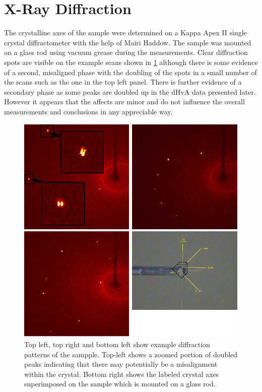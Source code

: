 
\section{X-Ray Diffraction}
    \label{Sec:3:XrayDiffraction}

The crystalline axes of the sample were determined on a Kappa Apex II single crystal diffractometer with the help of Mairi Haddow. The sample was mounted on a glass rod using vacuum grease during the measurements. Clear diffraction spots are visible on the example scans shown in \fig\ref{Fig:3:XRayDiffraction} although there is some evidence of a second, misaligned phase with the doubling of the spots in a small number of the scans such as the one in the top left panel. There is further evidence of a secondary phase as some peaks are doubled up in the dHvA data presented later. However it appears that the affects are minor and do not influence the overall measurements and conclusions in any appreciable way.
\begin{figure}[h!]
    \begin{center}
        \includegraphics[scale=0.7]{Chapter3-dHvABaFe2P2/Figures/Xrays/XRayDiffraction/XRayDiffraction}
        \caption{Top left, top right and bottom left show example diffraction patterns of the \BaFeP sampple. Top-left shows a zoomed portion of doubled peaks indicating that there may potentially be a misalignment within the crystal. Bottom right shows the labeled crystal axes superimposed on the sample which is mounted on a glass rod.}
        \label{Fig:3:XRayDiffraction}
    \end{center}
\end{figure}

